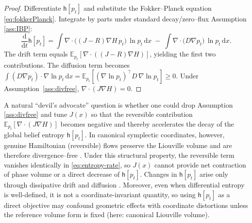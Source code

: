 \documentclass[final,5p,times,twocolumn]{elsarticle}
\newcommand{\diff}{\mathrm{d}}
\begin{document}
	
	\begin{proof}
		Differentiate \(\mathsf h[p_t]\) and substitute the Fokker--Planck equation \eqref{eq:fokkerPlanck}. Integrate by parts under standard decay/zero--flux Assumption \ref{ass:IBP}:
		\[
		\frac{\diff}{\diff t}\mathsf h[p_t]
		= \int \nabla\!\cdot\big((J-R)\nabla H\,p_t\big)\,\ln p_t\,\diff x
		\;-\;
		\int \nabla\!\cdot\big(D\nabla p_t\big)\,\ln p_t\,\diff x.
		\]
		The drift term equals \(\mathbb E_{p_t}[\nabla\!\cdot((J-R)\nabla H)]\), yielding the first two contributions. The diffusion term becomes \(\int (D\nabla p_t)\cdot\nabla\ln p_t\,\diff x = \mathbb E_{p_t}[(\nabla\!\ln p_t)^\top D\,\nabla\!\ln p_t]\ge 0\). Under Assumption~\ref{ass:divfree}, \(\nabla\!\cdot(J\nabla H)=0\).
	\end{proof}
	
	A natural ``devil's advocate'' question is whether one could drop Assumption \ref{ass:divfree} and tune $J(x)$ so that the reversible contribution $\mathbb{E}_{p_t}[\nabla\!\cdot(J\nabla H)]$ becomes negative and thereby accelerates the decay of the global belief entropy $\mathsf h[p_t]$. In canonical symplectic coordinates, however, genuine Hamiltonian (reversible) flows preserve the Liouville volume and are therefore divergence--free \citep[Sec.~9]{Arnold1989}. Under this structural property, the reversible term vanishes identically in \eqref{eq:entropy-rate}, so $J(x)$ cannot provide net contraction of phase volume or a direct decrease of $\mathsf h[p_t]$. Changes in $\mathsf h[p_t]$ arise only through dissipative drift and diffusion \citep{Risken1996,Gardiner2009}. Moreover, even when differential entropy is well-defined, it is not a coordinate-invariant quantity, so using $\mathsf h[p_t]$ as a direct objective may confound geometric effects with coordinate distortions unless the reference volume form is fixed (here: canonical Liouville volume).
	
\end{document}

